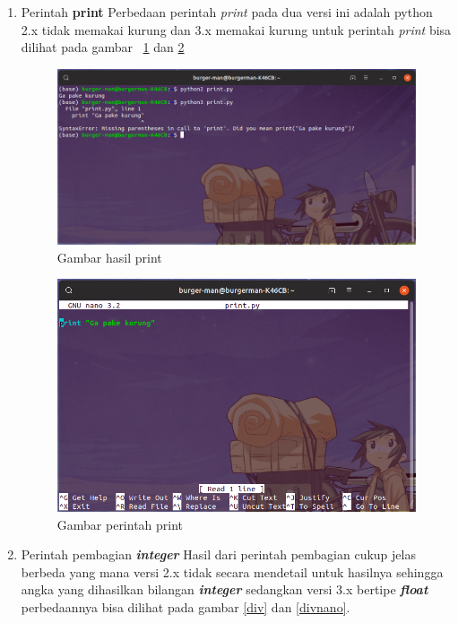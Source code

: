 \begin{enumerate}

\item Perintah \textbf{print}
Perbedaan perintah \textit{print} pada dua versi ini adalah python 2.x tidak memakai kurung dan 3.x memakai kurung untuk perintah \textit{print} bisa dilihat pada gambar ~\ref{print} dan \ref{printnano}

\begin{figure}[H]
\centering
\includegraphics[width=1\textwidth]{figures/print.png}
\caption{Gambar hasil print}
\label{print}
\end{figure}

\begin{figure}[H]
\centering
\includegraphics[width=1\textwidth]{figures/printnano.png}
\caption{Gambar perintah print}
\label{printnano}
\end{figure}

\item Perintah pembagian \textbf{\textit{integer}}
Hasil dari perintah pembagian cukup jelas berbeda yang mana versi 2.x tidak secara mendetail untuk hasilnya sehingga angka yang dihasilkan bilangan \textbf{\textit{integer}} sedangkan versi 3.x bertipe \textbf{\textit{float}} perbedaannya bisa dilihat pada gambar \ref{div} dan \ref{divnano}.


\end{enumerate}
